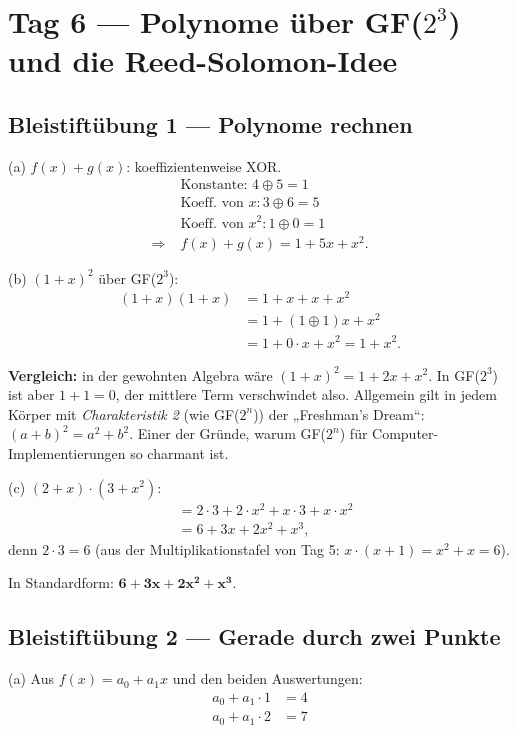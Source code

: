 \section{Tag 6 — Polynome über GF($2^3$) und die Reed-Solomon-Idee}

\subsection*{Bleistiftübung 1 — Polynome rechnen}

(a) $f(x) + g(x)$: koeffizientenweise XOR.
\begin{align*}
  &\text{Konstante: } 4 \oplus 5 = 1 \\
  &\text{Koeff. von } x: 3 \oplus 6 = 5 \\
  &\text{Koeff. von } x^2: 1 \oplus 0 = 1 \\
  \Rightarrow\; & f(x) + g(x) = 1 + 5x + x^2.
\end{align*}

(b) $(1+x)^2$ über GF($2^3$):
\begin{align*}
  (1 + x)(1 + x)
  &= 1 + x + x + x^2 \\
  &= 1 + (1 \oplus 1) x + x^2 \\
  &= 1 + 0 \cdot x + x^2 = 1 + x^2.
\end{align*}

\textbf{Vergleich:} in der gewohnten Algebra wäre $(1+x)^2 = 1 + 2x +
x^2$. In GF($2^3$) ist aber $1 + 1 = 0$, der mittlere Term
verschwindet also. Allgemein gilt in jedem Körper mit
\emph{Charakteristik 2} (wie GF($2^n$)) der „Freshman's Dream“:
$(a + b)^2 = a^2 + b^2$. Einer der Gründe, warum GF($2^n$) für
Computer-Implementierungen so charmant ist.

(c) $(2 + x) \cdot (3 + x^2)$:
\begin{align*}
  &= 2 \cdot 3 + 2 \cdot x^2 + x \cdot 3 + x \cdot x^2 \\
  &= 6 + 3x + 2x^2 + x^3,
\end{align*}
denn $2 \cdot 3 = 6$ (aus der Multiplikationstafel von Tag 5:
$x \cdot (x+1) = x^2 + x = 6$).

In Standardform: $\mathbf{6 + 3x + 2x^2 + x^3}$.

\subsection*{Bleistiftübung 2 — Gerade durch zwei Punkte}

(a) Aus $f(x) = a_0 + a_1 x$ und den beiden Auswertungen:
\begin{align*}
  a_0 + a_1 \cdot 1 &= 4 \\
  a_0 + a_1 \cdot 2 &= 7
\end{align*}

